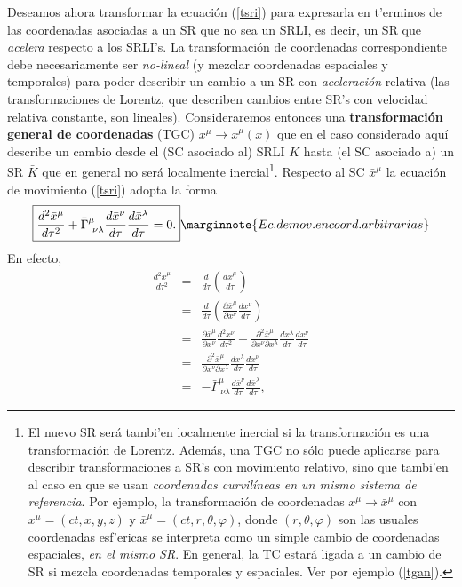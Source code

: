 Deseamos ahora transformar la ecuación (\ref{tsri}) para expresarla en t'erminos de las coordenadas asociadas a un SR que no sea un SRLI, es decir, un SR que \textit{acelera} respecto a los SRLI's. La transformación de coordenadas correspondiente debe necesariamente ser \textit{no-lineal} (y mezclar coordenadas espaciales y temporales) para poder describir un cambio a un SR con \textit{aceleración} relativa (las transformaciones de Lorentz, que describen cambios entre SR's con velocidad relativa constante, son lineales). Consideraremos entonces una \textbf{transformación general de coordenadas} (TGC) $x^\mu\rightarrow \bar{x}^\mu(x)$ que en el caso considerado aquí describe un cambio desde el (SC asociado al) SRLI $K$ hasta (el SC asociado a) un SR $\bar{K}$ que en general no será localmente inercial\footnote{El nuevo SR será tambi'en localmente inercial si la transformación es una transformación de Lorentz. Además, una TGC no sólo puede aplicarse para describir transformaciones a SR's con movimiento relativo, sino que tambi'en al caso en que se usan \textit{coordenadas curvilíneas en un mismo sistema de referencia}. Por ejemplo, la transformación de coordenadas
$x^\mu\to\bar{x}^\mu$ con $x^\mu=(ct,x,y,z)$ y $\bar{x}^\mu=(ct,r,\theta,\varphi)$, donde $(r,\theta,\varphi)$ son las usuales coordenadas esf'ericas se interpreta
como un simple cambio de coordenadas espaciales, \textit{en el mismo SR}. En general, la TC estará ligada a un cambio de SR si mezcla coordenadas temporales y espaciales. Ver por ejemplo (\ref{tgan}).}. Respecto al SC $\bar{x}^\mu$ la ecuación de movimiento (\ref{tsri}) adopta la forma
\begin{equation}
\boxed{\frac{d^2\bar{x}^\mu}{d\tau ^2}+\bar{\Gamma }_{\ \nu
\lambda }^\mu\frac{d\bar{x}^{\nu }}{d\tau }\frac{d\bar{x}%
^\lambda }{d\tau }=0.} \label{tsrni}\marginnote{Ec. de mov. en coord. arbitrarias}
\end{equation}
En efecto,
\begin{eqnarray}
\frac{d^2\bar{x}^\mu}{d\tau ^2} &=&\frac{d}{d\tau }\left(
\frac{d\bar{x}^\mu}{d\tau } \right) \\
&=&\frac{d}{d\tau }\left( \frac{\partial \bar{x}^\mu}{\partial x^{\nu
}}\frac{dx^{\nu }}{d\tau }\right) \\
&=&\frac{\partial \bar{x}^\mu}{\partial x^\nu } \frac{d^2x^{\nu }}{d\tau
^2}+\frac{\partial ^2\bar{x}^\mu }{\partial x^{\nu }\partial x^\lambda
}\frac{dx^\lambda }{d\tau }\frac{dx^{\nu }}{d\tau } \\
&=&\frac{\partial ^2\bar{x}^\mu }{\partial x^{\nu }\partial x^\lambda
}\frac{dx^\lambda }{d\tau }\frac{dx^{\nu }}{d\tau } \\
&=&-\bar{\Gamma }_{\ \nu
\lambda }^\mu\frac{d\bar{x}^{\nu }}{d\tau }\frac{d\bar{x}%
^\lambda }{d\tau } ,
\end{eqnarray}
